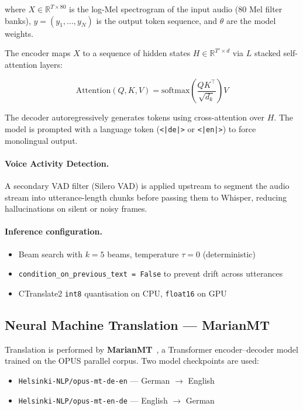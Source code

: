 \documentclass[12pt,a4paper]{report}
\begin{document}
where $X \in \mathbb{R}^{T \times 80}$ is the log-Mel spectrogram of
the input audio (80 Mel filter banks), $y = (y_1, \ldots, y_N)$ is
the output token sequence, and $\theta$ are the model weights.

The encoder maps $X$ to a sequence of hidden states $H \in
\mathbb{R}^{T' \times d}$ via $L$ stacked self-attention layers:

\begin{equation}
  \mathrm{Attention}(Q,K,V) = \mathrm{softmax}\!\left(\frac{QK^\top}{\sqrt{d_k}}\right)V
\end{equation}

The decoder autoregressively generates tokens using cross-attention over
$H$. The model is prompted with a language token (\texttt{<|de|>} or
\texttt{<|en|>}) to force monolingual output.

\paragraph{Voice Activity Detection.}
A secondary VAD filter (Silero VAD) is applied upstream to segment the
audio stream into utterance-length chunks before passing them to
Whisper, reducing hallucinations on silent or noisy frames.

\paragraph{Inference configuration.}
\begin{itemize}
  \item Beam search with $k=5$ beams, temperature $\tau=0$ (deterministic)
  \item \texttt{condition\_on\_previous\_text = False} to prevent drift
        across utterances
  \item CTranslate2 \texttt{int8} quantisation on CPU, \texttt{float16}
        on GPU
\end{itemize}

\subsection{Neural Machine Translation — MarianMT}

Translation is performed by \textbf{MarianMT}~\cite{junczys2018marian},
a Transformer encoder--decoder model trained on the OPUS parallel corpus.
Two model checkpoints are used:

\begin{itemize}
  \item \texttt{Helsinki-NLP/opus-mt-de-en} — German $\to$ English
  \item \texttt{Helsinki-NLP/opus-mt-en-de} — English $\to$ German
\end{itemize}
\end{document}
